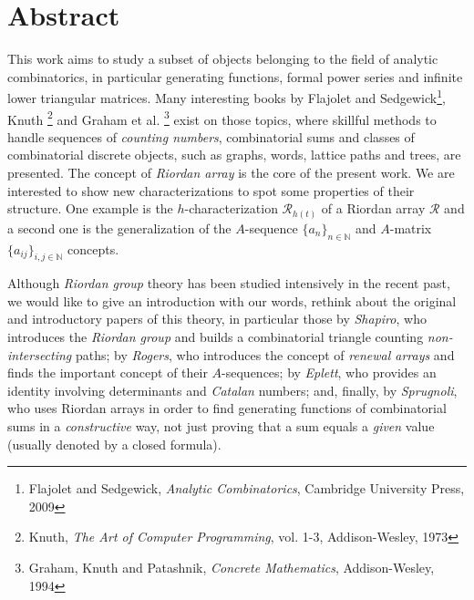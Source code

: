 \begingroup
\let\clearpage\relax
\let\cleardoublepage\relax
\let\cleardoublepage\relax

\vskip-2cm
\chapter*{Abstract}

\iftrue 
This work aims to study a subset of objects belonging to the field of analytic combinatorics,
in particular generating functions, formal power series
and infinite lower triangular matrices. Many interesting
books by Flajolet and Sedgewick\footnote{Flajolet and Sedgewick,
\emph{Analytic Combinatorics}, Cambridge University Press, 2009}, Knuth
\footnote{Knuth, \emph{The Art of Computer Programming}, vol.  1-3, Addison-Wesley,
1973} and Graham et al. \footnote{Graham, Knuth and Patashnik, \emph{Concrete
Mathematics}, Addison-Wesley, 1994} exist on those topics, where skillful
methods to handle sequences of \emph{counting numbers}, combinatorial sums and
classes of combinatorial discrete objects, such as graphs, words, lattice paths
and trees, are presented. The concept of \emph{Riordan array} is
the core of the present work.  We are interested to show new characterizations
to spot some properties of their structure. One example is the
$h$-characterization $\mathcal{R}_{h(t)}$ of a Riordan array $\mathcal{R}$ and
a second one is the generalization of the $A$-sequence $\lbrace
a_{n}\rbrace_{n\in\mathbb{N}}$ and $A$-matrix $\lbrace
a_{ij}\rbrace_{i,j\in\mathbb{N}}$ concepts.

Although \emph{Riordan group} theory has been studied intensively in the recent past, we would
like to give an introduction with our words, rethink about the original and
introductory papers of this theory, in particular those by \emph{Shapiro}, who
introduces the \emph{Riordan group} and builds a combinatorial triangle
counting \emph{non-intersecting} paths; by \emph{Rogers}, who introduces the
concept of \emph{renewal arrays} and finds the important concept of their
$A$-sequences; by \emph{Eplett}, who provides an identity involving
determinants and \emph{Catalan} numbers; and, finally, by \emph{Sprugnoli}, who
uses Riordan arrays in order to find generating functions of combinatorial sums
in a \emph{constructive} way, not just proving that a sum equals a \emph{given}
value (usually denoted by a closed formula). 

